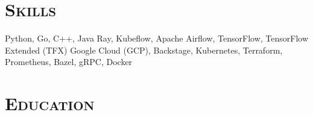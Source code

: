 \documentclass[alternative,10pt,compact]{yaac-another-awesome-cv}
\newcommand\sectionHeader[1]{\section{\texorpdfstring{\color{accentcolor}\textsc{#1}}{#1}}}
\begin{document}
\sectionHeader{Skills}

\begin{keywords}
  {
    Python,
    Go,
    C++,
    Java
  }
  {
    Ray,
    Kubeflow,
    Apache Airflow,
    TensorFlow,
    TensorFlow Extended (TFX)
  }
  {
    Google Cloud (GCP),
    Backstage,
    Kubernetes,
    Terraform,
    Prometheus,
    Bazel,
    gRPC,
    Docker
  }
\end{keywords}

\sectionHeader{Education}

\begin{scholarship}
\end{scholarship}
\end{document}
